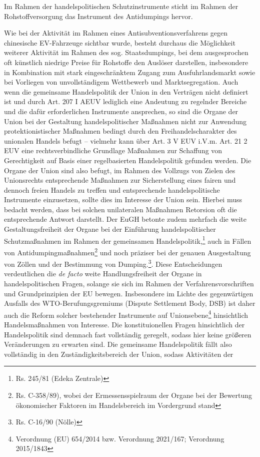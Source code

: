 \documentclass[12pt,a4paper,oneside]{book} %
\begin{document}
Im Rahmen der handelspolitischen Schutzinstrumente sticht im Rahmen der Rohstoffversorgung das Instrument des Antidumpings hervor. 

Wie bei der Aktivität im Rahmen eines Antisubventionsverfahrens gegen chinesische EV-Fahrzeuge sichtbar wurde, besteht durchaus die Möglichkeit weiterer Aktivität im Rahmen des sog. \glqq Staatsdumpings\grqq, bei dem ausgesprochen oft künstlich niedrige Preise für Rohstoffe den Auslöser darstellen, insbesondere in Kombination mit stark eingeschränktem Zugang zum Ausfuhrlandsmarkt sowie bei Vorliegen von unvollständigem Wettbewerb und Marktsegregation.\autocite{Hoffmesiter, Hrenzler/Herrmann/Niestedt, EU Außenwirtschaftrecht, VII 70 Rn14ff} Auch wenn die gemeinsame Handelspolitik der Union in den Verträgen nicht definiert ist und durch Art. 207 I AEUV lediglich eine Andeutung zu regelnder Bereiche und die dafür erforderlichen Instrumente ansprechen, so sind die Organe der Union bei der Gestaltung handelspolitischer Maßnahmen nicht zur Anwendung protektionistischer Maßnahmen bedingt durch den Freihandelscharakter des unionalen Handels befugt -- vielmehr kann über Art. 3 V EUV i.V.m. Art. 21 2 EUV eine rechtsverbindliche Grundlage Maßnahmen zur Schaffung von Gerechtigkeit auf Basis einer regelbasierten Handelspolitik gefunden werden.\autocite{Paschke, RdTW 2024, 216.} Die Organe der Union sind also befugt, im Rahmen des Vollzugs von Zielen des Unionsrechts entsprechende Maßnahmen zur Sicherstellung eines fairen und dennoch freien Handels zu treffen und entsprechende handelspolitische Instrumente einzusetzen, sollte dies im Interesse der Union sein.\autocite{Paschke, RdTW 2024, 206.; Callies/Ruffert Art 206 AEUV 8f; Grabitz Art. 206 AEUV Rn. 12} Hierbei muss bedacht werden, dass bei solchen unilateralen Maßnahmen Retorsion oft die entsprechende Antwort darstellt.\autocite{Altemöller, EuzW 2019, 321} Der EuGH betonte zudem mehrfach die weite Gestaltungsfreiheit der Organe bei der Einführung handelspolitischer Schutzmaßnahmen im Rahmen der gemeinsamen Handelspolitik,\footnote{Rs. 245/81 (Edeka Zentrale)} auch in Fällen von Antidumpingmaßnahmen\footnote{Rs. C-358/89), wobei der Ermessensspielraum der Organe bei der Bewertung ökonomischer Faktoren im Handelsbereich im Vordergrund stand} und noch präziser bei der genauen Ausgestaltung von Zöllen und der Bestimmung von \glqq Dumping\grqq.\footnote{Rs. C-16/90 (Nölle)}. Diese Entscheidungen verdeutlichen die \textit{de facto} weite Handlungsfreiheit der Organe in handelspolitischen Fragen, solange sie sich im Rahmen der Verfahrensvorschriften und Grundprinzipien der EU bewegen. Insbesondere im Lichte des gegenwärtigen Ausfalls des WTO-Berufungsgremiums (Dispute Settlement Body, DSB) ist daher auch die Reform solcher bestehender Instrumente auf Unionsebene\footnote{Verordnung (EU) 654/2014 bzw. Verordnung 2021/167; Verordnung 2015/1843} hinsichtlich Handelsmaßnahmen von Interesse.\autocite{Schäffer, EuZW 2023, 695, 698} Die konstituionellen Fragen hinsichtlich der Handelspolitik sind demnach fast vollständig geregelt, sodass hier keine größeren Veränderungen zu erwarten sind.\autocite{Müller-Ibold/Herrmann, EuZW 2022, 1029, 1030} Die gemeinsame Handelspolitik fällt also vollständig in den Zuständigkeitsbereich der Union, sodass Aktivitäten der 
\end{document}
